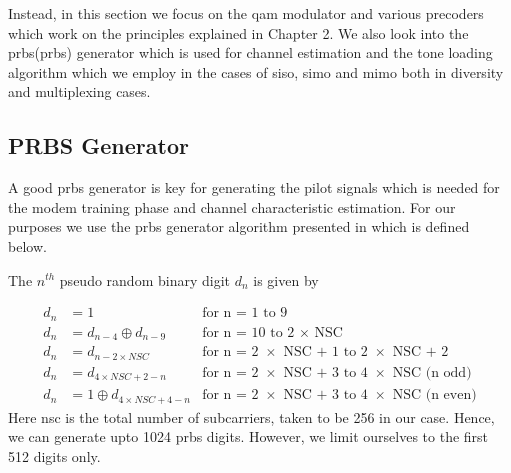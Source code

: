 Instead, in this section we focus on the \acrshort{qam} modulator and various precoders which work on the principles explained in Chapter 2. We also look into the \acrlong{prbs}(\acrshort{prbs}) generator which is used for channel estimation and the tone loading algorithm which we employ in the cases of \acrshort{siso}, \acrshort{simo} and \acrshort{mimo} both in diversity and multiplexing cases.

\subsection{PRBS Generator}
A good \acrlong{prbs} generator is key for generating the pilot signals which is needed for the modem training phase and channel characteristic estimation. For our purposes we use the \acrshort{prbs} generator algorithm presented in \textcite{ITU2009} which is defined below.

The $n^{th}$ pseudo random binary digit $d_n$ is given by 

\begin{align*}
d_n &= 1 & \text{for n = 1 to 9}\\
d_n &= d_{n-4} \oplus d_{n-9} & \text{for n = 10 to 2 $\times$ NSC}\\
d_n &= d_{n-2 \times NSC} & \text{for n = 2 $\times$ NSC + 1 to 2 $\times$ NSC + 2}\\
d_n &= d_{4 \times NSC +2 -n} & \text{for n = 2 $\times$ NSC + 3 to 4 $\times$ NSC (n odd)}\\
d_n &= 1 \oplus d_{4 \times NSC +4 -n} & \text{for n = 2 $\times$ NSC + 3 to 4 $\times$ NSC (n even)}
\end{align*}
Here \acrshort{nsc} is the total number of subcarriers, taken to be 256 in our case. Hence, we can generate upto 1024 \acrshort{prbs} digits. However, we limit ourselves to the first 512 digits only.

